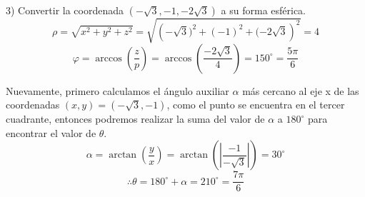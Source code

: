 \vspace{4mm}
3) Convertir la coordenada ${\left(-\sqrt{3},-1,-2\sqrt{3}\right)}$ a su forma esférica.
\[\rho = \sqrt{x^{2}+y^{2}+z^{2}} = \sqrt{\left(-\sqrt{3})^{2}+(-1)^{2}+(-2\sqrt{3}\right)^{2}} = 4\]
\[\varphi = \arccos\left(\frac{z}{p}\right) = \arccos\left(\frac{-2\sqrt{3}}{4}\right) = 150^{\circ} = \frac{5\pi}{6} \]

\vspace{4mm}
Nuevamente, primero calculamos el ángulo auxiliar ${\alpha}$ más cercano al eje x de las coordenadas ${\left(x,y\right) = \left(-\sqrt{3},-1\right)}$, como el punto se encuentra en el tercer cuadrante, entonces podremos realizar la suma del valor de ${\alpha}$ a ${180^{\circ}}$ para encontrar el valor de ${\theta}$.
\[\alpha = \arctan\left(\frac{y}{x}\right) = \arctan\left( \left|\frac{-1}{-\sqrt{3}}\right| \right) = 30^{\circ}\]
\[\therefore \theta = 180^{\circ} + \alpha = 210^{\circ} = \frac{7\pi}{6}\]

\cite{lehmann}
